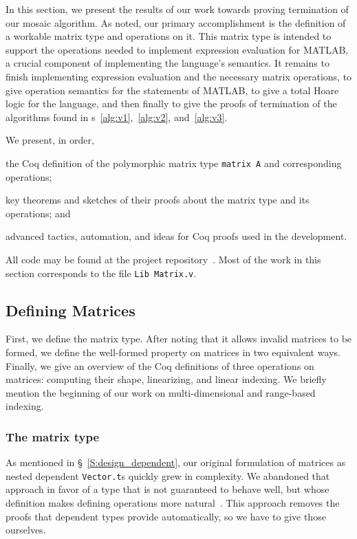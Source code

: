 \documentclass[11pt,conference]{IEEEtran}
\newcommand{\matlab}{MATLAB}
\newcommand{\mmatlab}{\textmu\matlab}
\theoremstyle{plain} %
\theoremstyle{definition}
\theoremstyle{remark}
\begin{document}
In this section, we present the results of our work towards proving termination
of our mosaic algorithm. As noted, our primary accomplishment is the definition
of a workable matrix type and operations on it. This matrix type is intended to
support the operations needed to implement expression evaluation for \mmatlab, a
crucial component of implementing the language's semantics. It remains to finish
implementing expression evaluation and the necessary matrix operations, to give
operation semantics for the statements of \mmatlab, to give a total Hoare logic
for the language, and then finally to give the proofs of termination of the
algorithms found in \figurename{s}~\ref{alg:v1},~\ref{alg:v2}, and~\ref{alg:v3}.

We present, in order,
\begin{inlist}
\item the Coq definition of the polymorphic matrix type \texttt{matrix A} and
    corresponding operations;
\item key theorems and sketches of their proofs about the matrix type and its
    operations; and
\item advanced tactics, automation, and ideas for Coq proofs used in the
    development.
\end{inlist}


All code may be found at the project repository~\cite{zelda_mosaic_proof}. Most
of the work in this section corresponds to the file \texttt{Lib Matrix.v}.

\subsection{Defining Matrices}\label{S:matrix_defn}

First, we define the matrix type. After noting that it allows invalid matrices
to be formed, we define the well-formed property on matrices in two equivalent
ways. Finally, we give an overview of the Coq definitions of three operations on
matrices: computing their shape, linearizing, and linear indexing. We briefly
mention the beginning of our work on multi-dimensional and range-based indexing.

\subsubsection{The matrix type}

As mentioned in \S~\ref{S:design_dependent}, our original formulation of
matrices as nested dependent \texttt{Vector.t}s quickly grew in complexity.
We abandoned that approach in favor of a type that is not guaranteed to behave
well, but whose definition makes defining operations more
natural~\cite{SO_2021_2}. This approach removes the proofs that dependent types
provide automatically, so we have to give those ourselves.
\end{document}
